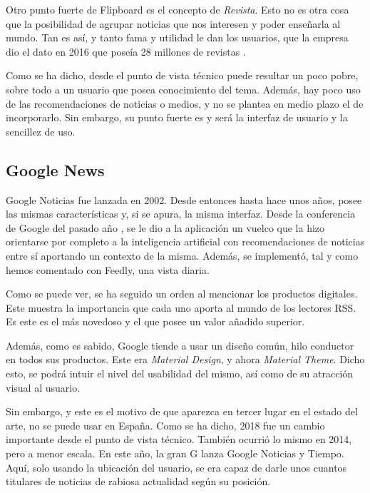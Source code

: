 Otro punto fuerte de Flipboard es el concepto de \textit{Revista}. Esto no es otra cosa que la posibilidad de agrupar noticias que nos interesen y poder enseñarla al mundo. Tan es así, y tanto fama y utilidad le dan los usuarios, que la empresa dio el dato en 2016 que poseía 28 millones de revistas .


Como se ha dicho, desde el punto de vista técnico puede resultar un poco pobre, sobre todo a un usuario que posea conocimiento del tema. Además, hay poco uso de las recomendaciones de noticias o medios, y no se plantea en medio plazo el de incorporarlo. Sin embargo, su punto fuerte es y será la interfaz de usuario y la sencillez de uso.

\subsection{Google News}

Google Noticias fue lanzada en 2002. Desde entonces hasta hace unos años, posee las mismas características y, si se apura, la misma interfaz. Desde la conferencia de Google del pasado año , se le dio a la aplicación un vuelco que la hizo orientarse por completo a la inteligencia artificial con recomendaciones de noticias entre sí aportando un contexto de la misma. Además, se implementó, tal y como hemos comentado con Feedly, una vista diaria.

Como se puede ver, se ha seguido un orden al mencionar los productos digitales. Este muestra la importancia que cada uno aporta al mundo de los lectores RSS. Es este es el más novedoso y el que posee un valor añadido superior.


Además, como es sabido, Google tiende a usar un diseño común, hilo conductor en todos sus productos. Este era \textit{Material Design}, y ahora \textit{Material Theme}. Dicho esto, se podrá intuir el nivel del usabilidad del mismo, así como de su atracción visual al usuario.

Sin embargo, y este es el motivo de que aparezca en tercer lugar en el estado del arte, no se puede usar en España. Como se ha dicho, 2018 fue un cambio importante desde el punto de vista técnico. También ocurrió lo mismo en 2014, pero a menor escala. En este año, la gran G lanza Google Noticias y Tiempo. Aquí, solo usando la ubicación del usuario, se era capaz de darle unos cuantos titulares de noticias de rabiosa actualidad según su posición.

